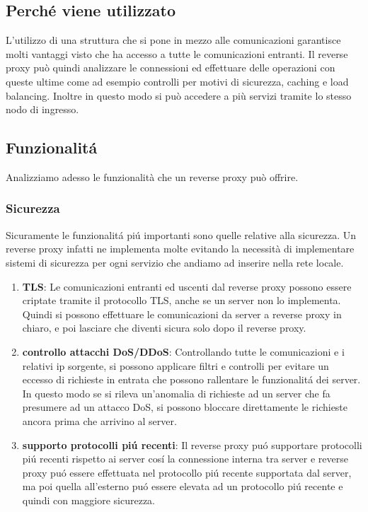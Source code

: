 \subsection{Perché viene utilizzato}
L'utilizzo di una struttura che si pone in mezzo alle comunicazioni garantisce molti vantaggi visto che ha accesso a tutte le comunicazioni entranti. Il reverse proxy può quindi analizzare le connessioni ed effettuare delle operazioni con queste ultime come ad esempio controlli per motivi di sicurezza, caching e load balancing. Inoltre in questo modo si può accedere a più servizi tramite lo stesso nodo di ingresso.

\subsection{Funzionalitá}
Analizziamo adesso le funzionalità che un reverse proxy può offrire.

\subsubsection{Sicurezza}
Sicuramente le funzionalitá piú importanti sono quelle relative alla sicurezza. Un reverse proxy infatti ne implementa molte evitando la necessità di implementare sistemi di sicurezza per ogni servizio che andiamo ad inserire nella rete locale.
\begin{enumerate}
  \item \textbf{TLS}: Le comunicazioni entranti ed uscenti dal reverse proxy possono essere criptate tramite il protocollo TLS, anche se un server non lo implementa. Quindi si possono effettuare le comunicazioni da server a reverse proxy in chiaro, e poi lasciare che diventi sicura solo dopo il reverse proxy.
  \item \textbf{controllo attacchi DoS/DDoS}: Controllando tutte le comunicazioni e i relativi ip sorgente, si possono applicare filtri e controlli per evitare un eccesso di richieste in entrata che possono rallentare le funzionalitá dei server. In questo modo se si rileva un'anomalia di richieste ad un server che fa presumere ad un attacco DoS, si possono bloccare direttamente le richieste ancora prima che arrivino al server.
  \item \textbf{supporto protocolli piú recenti}: Il reverse proxy puó supportare protocolli piú recenti rispetto ai server cosí la connessione interna tra server e reverse proxy puó essere effettuata nel protocollo piú recente supportata dal server, ma poi quella all'esterno puó essere elevata ad un protocollo piú recente e quindi con maggiore sicurezza.

\end{enumerate}

